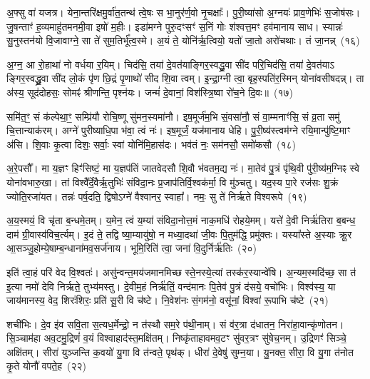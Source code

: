 अ॒फ्सु वा॑ यजत्र। येना॒न्तरि॑क्षमु॒र्वा॑त॒तन्थ॑ त्वे॒षः स भा॒नुर॑र्ण॒वो नृ॒चक्षाः᳚। पु॒री॒ष्या॑सो अ॒ग्नयः॑ प्राव॒णेभिः॑ स॒जोष॑सः। जु॒षन्ताꣳ॑ ह॒व्यमाहु॑तमनमी॒वा इषो॑ म॒हीः। इडा॑मग्ने पुरु॒दꣳसꣳ॑ स॒निं गोः श॑श्वत्त॒मꣳ हव॑मानाय साध। स्यान्नः॑ सु॒नुस्तन॑यो वि॒जावाग्ने॒ सा ते॑ सुम॒तिर्भू᳚त्व॒स्मे। अ॒यं ते॒ योनि॑र्\mbox{}ऋ॒त्वियो॒ यतो॑ जा॒तो अरो॑चथाः। तं जा॒नन्न्~(१६)

अ॒ग्न॒ आ रो॒हाथा॑ नो वर्धया र॒यिम्। चिद॑सि॒ तया॑ दे॒वत॑याङ्गिर॒स्वद्ध्रु॒वा सी॑द परि॒चिद॑सि॒ तया॑ दे॒वत॑या\-ऽ ङ्गिर॒स्वद्ध्रु॒वा सी॑द लो॒कं पृ॑ण छि॒द्रं पृ॒णाथो॑ सीद शि॒वा त्वम्। इ॒न्द्रा॒ग्नी त्वा॒ बृह॒स्पति॑र॒स्मिन् योना॑वसीषदन्न्। ता अ॑स्य॒ सूद॑दोहसः॒ सोमꣴ॑ श्रीणन्ति॒ पृश्न॑यः। जन्मं॑ दे॒वानां॒ विश॑स्त्रि॒ष्वा रो॑च॒ने दि॒वः॥~(१७)

{\anuvakamend[{अ॒स्त्वोष॑धीषु जा॒नन्न॒ष्टाच॑त्वारिꣳशच्च}]}%

समि॑त॒ꣳ॒ सं क॑ल्पेथा॒ꣳ॒ सम्प्रि॑यौ रोचि॒ष्णू सु॑मन॒स्यमा॑नौ। इष॒मूर्ज॑म॒भि सं॒वसा॑नौ॒ सं वा॒म्मनाꣳ॑सि॒ सं व्र॒ता समु॑ चि॒त्तान्याक॑रम्। अग्ने॑ पुरीष्याधि॒पा भ॑वा॒ त्वं नः॑। इष॒मूर्जं॒ यज॑मानाय धेहि। पु॒री॒ष्य॑स्त्वम॑ग्ने रयि॒मान्पु॑ष्टि॒माꣳ अ॑सि। शि॒वाः कृ॒त्वा दिशः॒ सर्वाः॒ स्वां योनि॑मि॒हास॑दः। भव॑तं नः॒ सम॑नसौ॒ समो॑कसौ~(१८)

अ॒रे॒पसौ᳚। मा य॒ज्ञꣳ हिꣳ॑सिष्टं॒ मा य॒ज्ञप॑तिं जातवेदसौ शि॒वौ भ॑वतम॒द्य नः॑। मा॒तेव॑ पु॒त्रं पृ॑थि॒वी पु॑री॒ष्य॑म॒ग्निꣴ स्वे योना॑वभारु॒खा। तां विश्वै᳚र्दे॒वैर्\mbox{}ऋ॒तुभिः॑ संविदा॒नः प्र॒जा\-प॑तिर्वि॒श्वक॑र्मा॒ वि मु॑ञ्चतु। यद॒स्य पा॒रे रज॑सः शु॒क्रं ज्योति॒रजा॑यत। तन्नः॑ पर्\mbox{}ष॒दति॒ द्विषो\-ऽग्ने॑ वैश्वानर॒ स्वाहा᳚। नमः॒ सु ते॑ निर्\mbox{}ऋते विश्वरूपे~(१९)

अ॒य॒स्मयं॒ वि चृ॑ता ब॒न्धमे॒तम्। य॒मेन॒ त्वं य॒म्या॑ संविदा॒नोत्त॒मं नाक॒मधि॑ रोहये॒मम्। यत्ते॑ दे॒वी निर्\mbox{}ऋ॑तिरा ब॒बन्ध॒ दाम॑ ग्री॒वास्व॑विच॒र्त्यम्। इ॒दं ते॒ तद्वि ष्या॒म्यायु॑षो॒ न मध्या॒दथा॑ जी॒वः पि॒तुम॑द्धि॒ प्रमु॑क्तः। यस्या᳚स्ते अ॒स्याः क्रू॒र आ॒सञ्जु॒होम्ये॒षाम्ब॒न्धाना॑मव॒सर्ज॑नाय। भूमि॒रिति॑ त्वा॒ जना॑ वि॒दुर्निर्\mbox{}ऋ॑तिः~(२०)

इति॑ त्वा॒हं परि॑ वेद वि॒श्वतः॑। असु॑न्वन्त॒मय॑जमानमिच्छ स्ते॒नस्ये॒त्यां तस्क॑र॒स्यान्वे॑षि। अ॒न्यम॒स्मदि॑च्छ॒ सा त॑ इ॒त्या नमो॑ देवि निर्\mbox{}ऋते॒ तुभ्य॑मस्तु। दे॒वीम॒हं निर्\mbox{}ऋ॑तिं॒ वन्द॑मानः पि॒तेव॑ पु॒त्रं द॑सये॒ वचो॑भिः। विश्व॑स्य॒ या जाय॑मानस्य॒ वेद॒ शिरः॑शिरः॒ प्रति॑ सू॒री वि च॑ष्टे। नि॒वेश॑नः सं॒गम॑नो॒ वसू॑नां॒ विश्वा॑ रू॒पाभि च॑ष्टे~(२१)

शची॑भिः। दे॒व इ॑व सवि॒ता स॒त्यध॒र्मेन्द्रो॒ न त॑स्थौ सम॒रे प॑थी॒नाम्। सं व॑र॒त्रा द॑धातन॒ निरा॑हा॒वान्कृ॑णोतन। सि॒ञ्चाम॑हा अव॒टमु॒द्रिणं॑ व॒यं विश्वाहाद॑स्त॒मक्षि॑तम्। निष्कृ॑ताहावमव॒टꣳ सु॑वर॒त्रꣳ सु॑षेच॒नम्। उ॒द्रिणꣳ॑ सिञ्चे॒ अक्षि॑तम्। सीरा॑ युञ्जन्ति क॒वयो॑ यु॒गा वि त॑न्वते॒ पृथ॑क्। धीरा॑ दे॒वेषु॑ सुम्न॒या। यु॒नक्त॒ सीरा॒ वि यु॒गा त॑नोत कृ॒ते योनौ॑ वपते॒ह~(२२)

